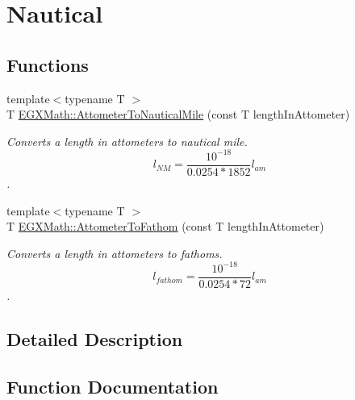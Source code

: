 \hypertarget{group___e_g_x_math-_conversions-_length_conversions-_attometer-_nautical}{}\section{Nautical}
\label{group___e_g_x_math-_conversions-_length_conversions-_attometer-_nautical}
\subsection*{Functions}
\begin{DoxyCompactItemize}
\item 
{\footnotesize template$<$typename T $>$ }\\T \mbox{\hyperlink{group___e_g_x_math-_conversions-_length_conversions-_attometer-_nautical_ga38f0b72d347141e8740bcf9d84a08d25}{E\+G\+X\+Math\+::\+Attometer\+To\+Nautical\+Mile}} (const T length\+In\+Attometer)
\begin{DoxyCompactList}\small\item\em Converts a length in attometers to nautical mile. \[ l_{NM}= \frac{10^{-18}}{0.0254 * 1852} l_{am} \]. \end{DoxyCompactList}\item 
{\footnotesize template$<$typename T $>$ }\\T \mbox{\hyperlink{group___e_g_x_math-_conversions-_length_conversions-_attometer-_nautical_ga969bc018e3f734e6c4012502d9c6c801}{E\+G\+X\+Math\+::\+Attometer\+To\+Fathom}} (const T length\+In\+Attometer)
\begin{DoxyCompactList}\small\item\em Converts a length in attometers to fathoms. \[ l_{fathom}= \frac{10^{-18}}{0.0254 * 72} l_{am} \]. \end{DoxyCompactList}\end{DoxyCompactItemize}


\subsection{Detailed Description}


\subsection{Function Documentation}
\mbox{\label{group___e_g_x_math-_conversions-_length_conversions-_attometer-_nautical_ga969bc018e3f734e6c4012502d9c6c801}} 
